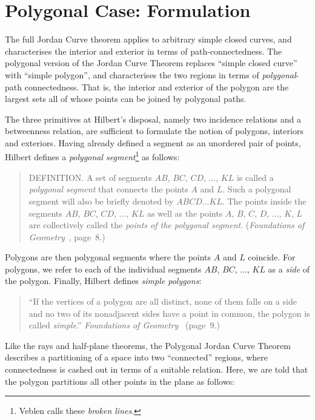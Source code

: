\section{Polygonal Case: Formulation}\label{sec:JordanCurveExplanation}
The full Jordan Curve theorem applies to arbitrary simple closed curves, and characterises the interior and exterior in terms of path-connectedness. The polygonal version of the Jordan Curve Theorem replaces ``simple closed curve'' with ``simple polygon'', and characterises the two regions in terms of \emph{polygonal}-path connectedness. That is, the interior and exterior of the polygon are the largest sets all of whose points can be joined by polygonal paths. 

The three primitives at Hilbert's disposal, namely two incidence relations and a betweenness relation, are sufficient to formulate the notion of polygons, interiors and exteriors. Having already defined a segment as an unordered pair of points, Hilbert defines a \emph{polygonal segment}\footnote{Veblen calls these \emph{broken lines}.} as follows:

\begin{quotation}
DEFINITION. A set of segments $AB$, $BC$, $CD$, $\ldots$, $KL$ is called a \emph{polygonal segment} that connects the points $A$ and $L$. Such a polygonal segment will also be briefly denoted by $ABCD\ldots KL$. The points inside the segments $AB$, $BC$, $CD$, $\ldots$, $KL$ as well as the points $A$, $B$, $C$, $D$, $\ldots$, $K$, $L$ are collectively called the \emph{points of the polygonal segment}. (\emph{Foundations of Geometry}~\cite{FoundationsOfGeometry}, page~8.)  
\end{quotation}

Polygons are then polygonal segments where the points $A$ and $L$ coincide. For polygons, we refer to each of the individual segments $AB$, $BC$, $\ldots$, $KL$ as a \emph{side} of the polygon. Finally, Hilbert defines \emph{simple polygons}:

\begin{quote}
``If the vertices of a polygon are all distinct, none of them falls on a side and no two of its nonadjacent sides have a point in common, the polygon is called \emph{simple}.'' \emph{Foundations of Geometry}~\cite{FoundationsOfGeometry} (page~9.)  
\end{quote}

Like the rays and half-plane theorems, the Polygonal Jordan Curve Theorem describes a partitioning of a space into two ``connected'' regions, where connectedness is cashed out in terms of a suitable relation. Here, we are told that the polygon partitions all other points in the plane as follows:

